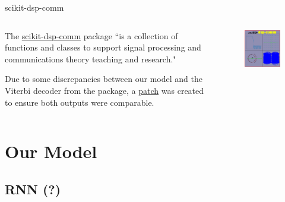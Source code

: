 \documentclass{beamer}
\newcommand{\<}				{\langle}
\renewcommand{\>}      		{\rangle}
\begin{document}
\begin{frame}{scikit-dsp-comm}


\begin{columns}
\begin{column}{0.47\textwidth}
The \href{https://scikit-dsp-comm.readthedocs.io/en/latest/}{scikit-dsp-comm} package ``is a collection of functions and classes to support signal processing and communications theory teaching and research."

\medskip

Due to some discrepancies between our model and the Viterbi decoder from the package, a \href{https://github.com/SupurCalvinHiggins/scikit-dsp-comm.git}{patch} was created to ensure both outputs were comparable. 

\end{column}
\begin{column}{0.47\textwidth}
\begin{figure}[h]
\includegraphics[scale=0.28]{scikit-dsp-comm-logo.png}
\end{figure}
\end{column}
\end{columns}
\end{frame}

\section{Our Model} 

\subsection{RNN (?)} 
\end{document}
